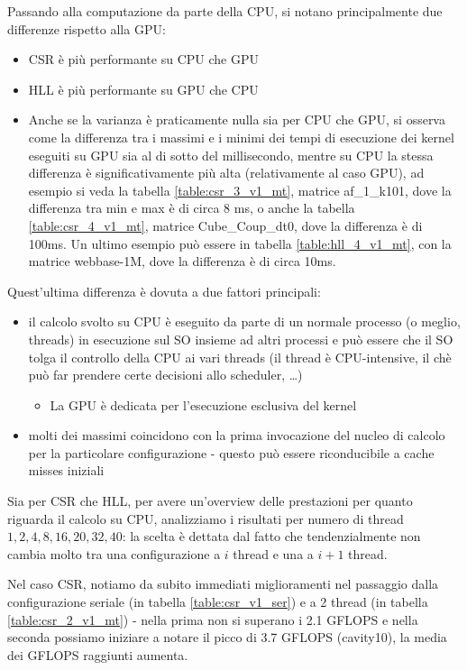 \documentclass[a4paper,9pt]{extarticle}
\begin{document}
Passando alla computazione da parte della CPU, si notano principalmente due differenze rispetto
alla GPU:
\begin{itemize}
	\item CSR è più performante su CPU che GPU
	\item HLL è più performante su GPU che CPU
	\item Anche se la varianza è praticamente nulla sia per CPU che GPU, si osserva
	come la differenza tra i massimi e i minimi dei tempi di esecuzione
	dei kernel eseguiti su GPU sia al di sotto del millisecondo, mentre su CPU la stessa
	differenza è significativamente più alta (relativamente al caso GPU), ad esempio si veda
	la tabella \ref{table:csr_3_v1_mt}, matrice af\_1\_k101, dove la differenza tra min e max 
	è di circa 8 ms, o anche la tabella \ref{table:csr_4_v1_mt}, matrice Cube\_Coup\_dt0, dove
	la differenza è di 100ms. Un ultimo esempio può essere in tabella \ref{table:hll_4_v1_mt},
	con la matrice webbase-1M, dove la differenza è di circa 10ms.
\end{itemize}

Quest'ultima differenza è dovuta a due fattori principali: 

\begin{itemize}
	\item il calcolo svolto su CPU è eseguito da parte
		di un normale processo (o meglio, threads)
	in esecuzione sul SO insieme ad altri processi e può essere che il SO
	tolga il controllo della CPU ai vari threads (il thread è CPU-intensive, il chè può far 
	prendere certe decisioni allo scheduler, \dots)
	
	\begin{itemize}
		\item La GPU è dedicata per l'esecuzione esclusiva del kernel
	\end{itemize}
	
	\item molti dei massimi coincidono con la prima invocazione del nucleo di calcolo per la
	particolare configurazione - 
	questo può essere riconducibile a cache misses iniziali
\end{itemize}

Sia per CSR che HLL, per avere un'overview delle prestazioni per quanto riguarda il calcolo
su CPU, analizziamo i risultati per numero di thread $1,2,4,8,16,20,32,40$: la scelta è dettata
dal fatto che tendenzialmente non cambia molto tra una configurazione a $i$ thread e una a $i+1$ 
thread.

Nel caso CSR, notiamo da subito immediati miglioramenti nel passaggio dalla configurazione seriale
(in tabella \ref{table:csr_v1_ser}) e a 2 thread (in tabella \ref{table:csr_2_v1_mt}) - nella
prima non si superano i 2.1 GFLOPS e nella seconda possiamo iniziare a notare il picco di 3.7 GFLOPS (cavity10), la media dei GFLOPS raggiunti aumenta. 
\end{document}
